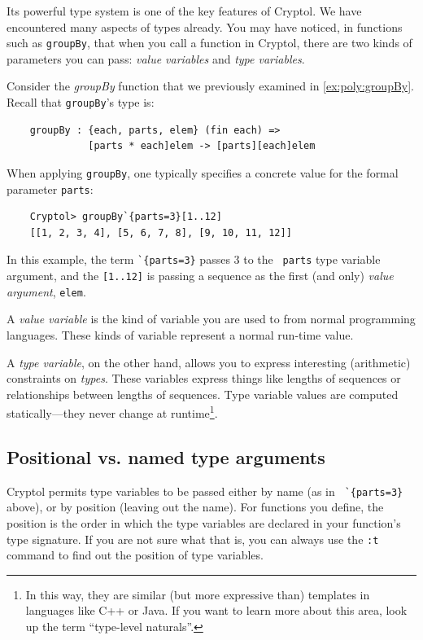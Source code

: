 Its powerful type system is one of the key features of Cryptol.  We
have encountered many aspects of types already.  You may have noticed,
in functions such as {\tt groupBy}, that when you call a function in
Cryptol, there are two kinds of parameters you can pass: {\it value
  variables} and {\it type variables}.

Consider the \emph{groupBy} function that we previously examined in
\autoref{ex:poly:groupBy}.  Recall that \texttt{groupBy}'s type is:
\begin{verbatim}
    groupBy : {each, parts, elem} (fin each) =>
              [parts * each]elem -> [parts][each]elem
\end{verbatim}
When applying \texttt{groupBy}, one typically specifies a concrete
value for the formal parameter \texttt{parts}:
\begin{Verbatim}
    Cryptol> groupBy`{parts=3}[1..12]
    [[1, 2, 3, 4], [5, 6, 7, 8], [9, 10, 11, 12]]
\end{Verbatim}
In this example, the term {\tt\Verb|`{parts=3}|} passes 3 to the {\tt
  parts} type variable argument, and the {\tt [1..12]} is passing a
sequence as the first (and only) {\it value argument}, \texttt{elem}.

A \emph{value variable} is the kind of variable you are used to from
normal programming languages.  These kinds of variable represent a
normal run-time value.  

A \emph{type variable}, on the other hand, allows you to express
interesting (arithmetic) constraints on \emph{types}. These variables
express things like lengths of sequences or relationships between
lengths of sequences.  Type variable values are computed
statically---they never change at runtime\footnote{In this way,
  they are similar (but more expressive than) templates in languages
  like C++ or Java. If you want to learn more about this area, look up
  the term ``type-level naturals''.}.

\subsection{Positional vs. named type
  arguments}\indTypePositionalArguments
\label{sec:positional-vs.-named}

Cryptol permits type variables to be passed either by name (as in {\tt
  \Verb|`{parts=3}|} above), or by position (leaving out the name).
For functions you define, the position is the order in which the type
variables are declared in your function's type signature. If you are
not sure what that is, you can always use the {\tt :t} command to find
out the position of type variables. 

